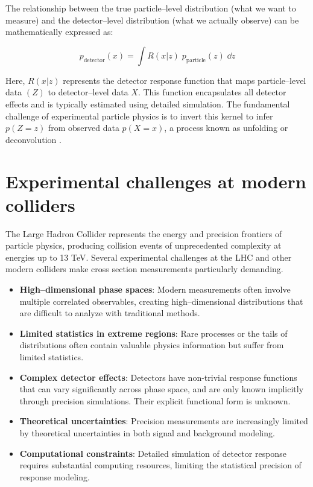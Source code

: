 The relationship between the true particle--level distribution (what we want to measure) and the detector--level distribution (what we actually observe) can be mathematically expressed as:

\begin{equation}
p_{\textrm{detector}}(x) = \int R(x|z)\;p_{\textrm{particle}}(z)\;\dd z
\end{equation}

Here, \(R(x | z)\) represents the detector response function that maps particle--level data \((Z)\) to detector--level data \(X\).
%
This function encapsulates all detector effects and is typically estimated using detailed simulation.
%
The fundamental challenge of experimental particle physics is to invert this kernel to infer \(p(Z = z)\) from observed data \(p(X = x)\), a process known as unfolding or deconvolution .

\section{Experimental challenges at modern colliders}

The Large Hadron Collider represents the energy and precision frontiers of particle physics, producing collision events of unprecedented complexity at energies up to 13 TeV.
%
Several experimental challenges at the LHC and other modern colliders make cross section measurements particularly demanding.

\begin{itemize}
\item \textbf{High--dimensional phase spaces}: Modern measurements often involve multiple correlated observables, creating high--dimensional distributions that are difficult to analyze with traditional methods.
\item \textbf{Limited statistics in extreme regions}: Rare processes or the tails of distributions often contain valuable physics information but suffer from limited statistics.
\item \textbf{Complex detector effects}: Detectors have non-trivial response functions that can vary significantly across phase space, and are only known implicitly through precision simulations. Their explicit functional form is unknown.
\item \textbf{Theoretical uncertainties}: Precision measurements are increasingly limited by theoretical uncertainties in both signal and background modeling.
\item \textbf{Computational constraints}: Detailed simulation of detector response requires substantial computing resources, limiting the statistical precision of response modeling.
\end{itemize}


